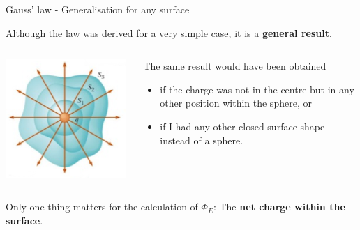 \begin{frame}{Gauss' law - Generalisation for any surface}

Although the law was derived for a very simple case, it is a {\bf general result}.\\
\vspace{0.2cm}

\begin{columns}
  \begin{column}{0.34\textwidth}
   \begin{center}
    \includegraphics[width=0.98\textwidth]{./images/schematics/gauss_law_generalisation_geom_0.png}\\
   \end{center}
  \end{column}
  \begin{column}{0.66\textwidth}
    The same result would have been obtained
    \begin{itemize}
     \item if the charge was not in the centre but in any other position within the sphere, or
     \item if I had any other closed surface shape instead of a sphere.
    \end{itemize}
  \end{column}
\end{columns}

Only one thing matters for the calculation of $\Phi_E$: The {\bf net charge within the surface}.

\end{frame}


